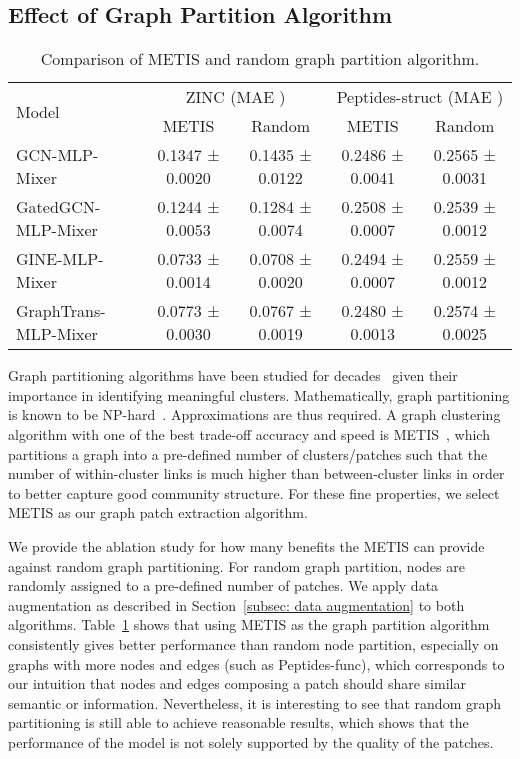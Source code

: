 \documentclass{article}
\begin{document}
\subsection{Effect of Graph Partition Algorithm}
\begin{table}[!ht]
\caption{Comparison of METIS and random graph partition algorithm.}
    \centering
    \footnotesize
    \begin{tabular}{lcccc}
    \toprule
         \multirow{2}{*}{Model}
         & \multicolumn{2}{c}{ZINC (MAE )} 
         & \multicolumn{2}{c}{Peptides-struct (MAE )} \\
         \cmidrule(lr){2-3}\cmidrule(lr){4-5}
         & METIS & Random & METIS & Random\\
         \midrule
    GCN-MLP-Mixer     
    & 0.1347 ± 0.0020 & 0.1435 ± 0.0122
    & 0.2486 ± 0.0041 & 0.2565 ± 0.0031\\
    GatedGCN-MLP-Mixer
    & 0.1244 ± 0.0053 & 0.1284 ± 0.0074
    & 0.2508 ± 0.0007 & 0.2539 ± 0.0012\\
    GINE-MLP-Mixer
    & 0.0733 ± 0.0014 & 0.0708 ± 0.0020
    & 0.2494 ± 0.0007 & 0.2559 ± 0.0012\\
    GraphTrans-MLP-Mixer
    & 0.0773 ± 0.0030 & 0.0767 ± 0.0019
    & 0.2480 ± 0.0013 & 0.2574 ± 0.0025\\
    \bottomrule
    \end{tabular}
    \label{tab:metis vs random graph partition}
\end{table}

Graph partitioning algorithms have been studied for decades~\citep{bulucc2016recent} given their importance in identifying meaningful clusters. Mathematically, graph partitioning is known to be NP-hard~\citep{chung1997spectral}. Approximations are thus required. A graph clustering algorithm with one of the best trade-off accuracy and speed is METIS~\citep{karypis1998metis}, which partitions a graph into a pre-defined number of clusters/patches such that the number of within-cluster links is much higher than between-cluster links in order to better capture good community structure. For these fine properties, we select METIS as our graph patch extraction algorithm.

We provide the ablation study for how many benefits the METIS can provide against random graph partitioning. For random graph partition, nodes are randomly assigned to a pre-defined number of patches. We apply data augmentation as described in Section~\ref{subsec: data augmentation} to both algorithms. Table~\ref{tab:metis vs random graph partition} shows that using METIS as the graph partition algorithm consistently gives better performance than random node partition, especially on graphs with more nodes and edges (such as Peptides-func), which corresponds to our intuition that nodes and edges composing a patch should share similar semantic or information. 
Nevertheless, it is interesting to see that random graph partitioning is still able to achieve reasonable results, which shows that the performance of the model is not solely supported by the quality of the patches.
\end{document}
